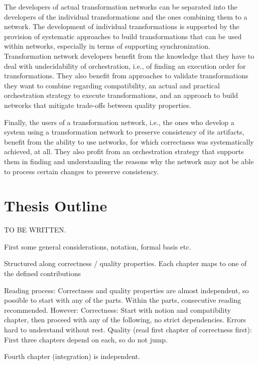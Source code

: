 The developers of actual transformation networks can be separated into the developers of the individual transformations and the ones combining them to a network.
The development of individual transformations is supported by the provision of systematic approaches to build transformations that can be used within networks, especially in terms of supporting synchronization.
Transformation network developers benefit from the knowledge that they have to deal with undecidability of orchestration, i.e., of finding an execution order for transformations.
They also benefit from approaches to validate transformations they want to combine regarding compatibility, an actual and practical orchestration strategy to execute transformations, and an approach to build networks that mitigate trade-offs between quality properties.

Finally, the users of a transformation network, i.e., the ones who develop a system using a transformation network to preserve consistency of its artifacts, benefit from the ability to use networks, for which correctness was systematically achieved, at all.
They also profit from an orchestration strategy that supports them in finding and understanding the reasons why the network may not be able to process certain changes to preserve consistency.



\section{Thesis Outline}

TO BE WRITTEN. 

First some general considerations, notation, formal basis etc.

Structured along correctness / quality properties.
Each chapter maps to one of the defined contributions

Reading process: Correctness and quality properties are almost independent, so possible to start with any of the parts. Within the parts, consecutive reading recommended.
However:
Correctness: Start with notion and compatibility chapter, then proceed with any of the following, no strict dependencies. Errors hard to understand without rest.
Quality (read first chapter of correctness first): First three chapters depend on each, so do not jump. 
\begin{integrationcontribution}
    Fourth chapter (integration) is independent.
\end{integrationcontribution}

